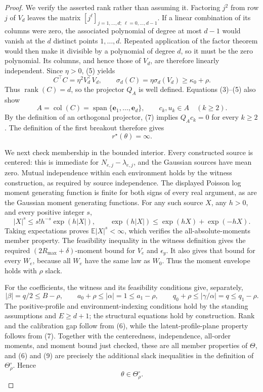 \documentclass{article}
\begin{document}
\begin{proof}
We verify the asserted rank rather than assuming it.  Factoring \(j^2\) from row \(j\) of \(V_d\) leaves the matrix \([j^\ell]_{j=1,\ldots,d;\ \ell=0,\ldots,d-1}\).  If a linear combination of its columns were zero, the associated polynomial of degree at most \(d-1\) would vanish at the \(d\) distinct points \(1,\ldots,d\).  Repeated application of the factor theorem would then make it divisible by a polynomial of degree \(d\), so it must be the zero polynomial.  Its columns, and hence those of \(V_d\), are therefore linearly independent.  Since \(\eta>0\), (5) yields
\[
 C^\top C=\eta^2V_d^\top V_d,
 \qquad
 \sigma_d(C)=\eta\sigma_d(V_d)\geq\kappa_0+\rho.              \tag{6}
\]
Thus \(\operatorname{rank}(C)=d\), so the projector \(Q_A\) is well defined.  Equations (3)--(5) also show
\[
 A=\operatorname{col}(C)
  =\operatorname{span}\{\mathbf e_1,\ldots,\mathbf e_d\},
 \qquad
 c_k,u_k\in A\quad(k\geq2).                                   \tag{7}
\]
By the definition of an orthogonal projector, (7) implies \(Q_Ac_k=0\) for every \(k\geq2\).  The definition of the first breakout therefore gives
\[
 r^\star(\theta)=\infty.                                       \tag{8}
\]

We next check membership in the bounded interior.  Every constructed source is centered: this is immediate for \(N_{e,j}-\lambda_{e,j}\), and the Gaussian sources have mean zero.  Mutual independence within each environment holds by the witness construction, as required by source independence.  The displayed Poisson log moment generating function is finite for both signs of every real argument, as are the Gaussian moment generating functions.  For any such source \(X\), any \(h>0\), and every positive integer \(s\),
\[
 |X|^s\leq s!h^{-s}\exp(h|X|),
 \qquad
 \exp(h|X|)\leq\exp(hX)+\exp(-hX).
\]
Taking expectations proves \(\mathbb E|X|^s<\infty\), which verifies the all-absolute-moments member property.  The feasibility inequality in the witness definition gives the required \((2R_{\max}+\delta)\)-moment bound for \(V_e\) and \(\epsilon_y\).  It also gives that bound for every \(W_e\), because all \(W_e\) have the same law as \(W_0\).  Thus the moment envelope holds with \(\rho\) slack.

For the coefficients, the witness and its feasibility conditions give, separately,
\[
 |\beta|=q/2\leq B-\rho,
 \qquad
 a_0+\rho\leq|\alpha|=1\leq a_1-\rho,
 \qquad
 q_0+\rho\leq|\gamma/\alpha|=q\leq q_1-\rho.                  \tag{9}
\]
The positive-profile and environment-indexing conditions hold by the standing assumptions and \(E\geq d+1\); the structural equations hold by construction.  Rank and the calibration gap follow from (6), while the latent-profile-plane property follows from (7).  Together with the centeredness, independence, all-order moments, and moment bound just checked, these are all member properties of \(\Theta\), and (6) and (9) are precisely the additional slack inequalities in the definition of \(\Theta_\rho^\circ\).  Hence
\[
 \theta\in\Theta_\rho^\circ.                                \tag{10}
\]


\end{proof}
\end{document}
